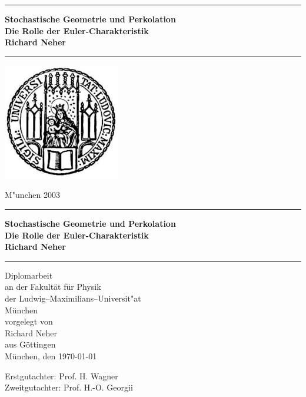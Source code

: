 \documentclass[12pt]{book}
\newcommand{\LMUTitle}[9]{
  \thispagestyle{empty}
  \vspace*{\stretch{1}}
  {\parindent0cm
   \rule{\linewidth}{.7ex}}
  \begin{flushright}

    \vspace*{\stretch{1}}
    \sffamily\bfseries\LARGE
    #1\\
    \large #9\\
    \vspace*{\stretch{1}}
    \sffamily\bfseries\large
    #2
    \vspace*{\stretch{1}}
  \end{flushright}
  \rule{\linewidth}{.7ex}
  \vspace*{\stretch{5}}
  \begin{center}
    \includegraphics[width=2in]{siegel}
  \end{center}
  \vspace*{\stretch{1}}
  \begin{center}\sffamily\LARGE{#5}\end{center}
  \newpage
  \thispagestyle{empty}

  \cleardoublepage
  \thispagestyle{empty}

  \vspace*{\stretch{1}}
  {\parindent0cm
  \rule{\linewidth}{.7ex}}
  \begin{flushright}
    \vspace*{\stretch{1}}
    \sffamily\bfseries\LARGE
    #1\\
    \large #9\\
    \vspace*{\stretch{1}}
    \sffamily\bfseries\large
    #2
    \vspace*{\stretch{1}}
  \end{flushright}
  \rule{\linewidth}{.7ex}

  \vspace*{\stretch{3}}
  \begin{center}
    \Large Diplomarbeit\\
    \Large an der #4\\
    \Large der Ludwig--Maximilians--Universit"at\\
    \Large M\"unchen\\
    \vspace*{\stretch{1}}
    \Large vorgelegt von\\
    \Large #2\\
    \Large aus #3\\
    \vspace*{\stretch{2}}
    \Large M\"unchen, den #6
  \end{center}

  \newpage
  \thispagestyle{empty}

  \vspace*{\stretch{1}}

  \begin{flushleft}
    \large Erstgutachter:  #7 \\[1mm]
    \large Zweitgutachter: #8 \\[1mm]
  \end{flushleft}

  \cleardoublepage
}
\begin{document}
  \frontmatter


  \LMUTitle
      {Stochastische Geometrie und Perkolation}
      {Richard Neher}                       %
      {G\"ottingen}                             %
      {Fakult\"at f\"ur Physik}                         %
      {M"unchen 2003}                          %
      {\today}                            %
      {Prof. H. Wagner}                          %
      {Prof. H.-O. Georgii}                         %
      {Die Rolle der Euler-Charakteristik}  %

  \tableofcontents


  \cleardoublepage

  \mainmatter\setcounter{page}{1}
  
  
  
  
  
  
  \appendix
  
  


  \backmatter
  
  \markboth{}{}


  
\end{document}
